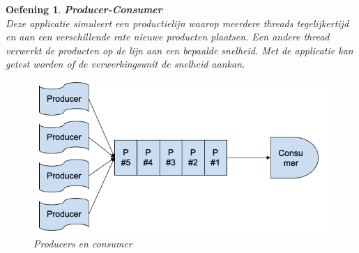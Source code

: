 \documentclass{tstextbook}
\newtheorem{envoefening}{Oefening}[chapter]
\newenvironment{oefening}
               {\begin{boxexercise}\begin{envoefening}}
               {\end{envoefening}\end{boxexercise}}
\begin{document}
\begin{oefening}
\textbf{Producer-Consumer}\\
Deze applicatie simuleert een productielijn waarop meerdere threads tegelijkertijd en aan een verschillende rate nieuwe producten plaatsen. Een andere thread verwerkt de producten op de lijn aan een bepaalde snelheid. Met de applicatie kan getest worden of de verwerkingsunit de snelheid aankan.
 
\begin{figure}[H]
\includegraphics[width=\linewidth]{images/h9/opgave_producer_consumer.png}
\caption{Producers en consumer}
\label{fig:producer_consumer}
\end{figure}


\end{oefening}
\end{document}
